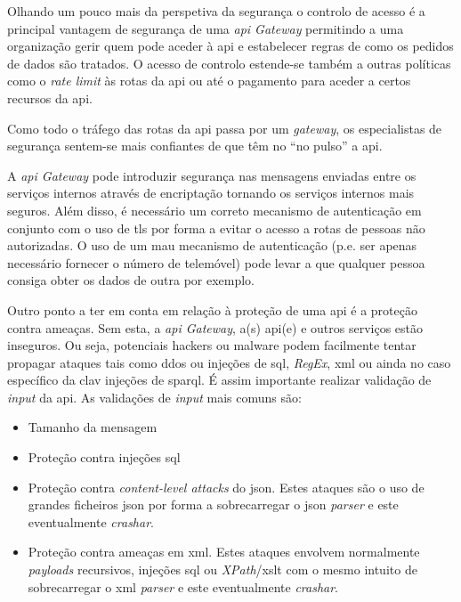 Olhando um pouco mais da perspetiva da segurança o controlo de acesso é a principal vantagem de segurança de uma \textit{\acrshort{api} Gateway} permitindo a uma organização gerir quem pode aceder à \acrshort{api} e estabelecer regras de como os pedidos de dados são tratados. O acesso de controlo estende-se também a outras políticas como o \textit{rate limit} às rotas da \acrshort{api} ou até o pagamento para aceder a certos recursos da \acrshort{api}.

Como todo o tráfego das rotas da \acrshort{api} passa por um \textit{gateway}, os especialistas de segurança sentem-se mais confiantes de que têm no ``no pulso'' a \acrshort{api}.~\cite{apiGatInfo}

A \textit{\acrshort{api} Gateway} pode introduzir segurança nas mensagens enviadas entre os serviços internos através de encriptação tornando os serviços internos mais seguros. Além disso, é necessário um correto mecanismo de autenticação em conjunto com o uso de \acrshort{tls} por forma a evitar o acesso a rotas de pessoas não autorizadas. O uso de um mau mecanismo de autenticação (p.e. ser apenas necessário fornecer o número de telemóvel) pode levar a que qualquer pessoa consiga obter os dados de outra por exemplo.

Outro ponto a ter em conta em relação à proteção de uma \acrshort{api} é a proteção contra ameaças. Sem esta, a \textit{\acrshort{api} Gateway}, a(s) \acrshort{api}(e) e outros serviços estão inseguros. Ou seja, potenciais hackers ou malware podem facilmente tentar propagar ataques tais como \acrshort{ddos} ou injeções de \acrshort{sql}, \textit{RegEx}, \acrshort{xml} ou ainda no caso específico da \acrshort{clav} injeções de \acrshort{sparql}. É assim importante realizar validação de \textit{input} da \acrshort{api}. As validações de \textit{input} mais comuns são:
\begin{itemize}
    \item Tamanho da mensagem
    \item Proteção contra injeções \acrshort{sql}
    \item Proteção contra \textit{content-level attacks} do \acrshort{json}. Estes ataques são o uso de grandes ficheiros \acrshort{json} por forma a sobrecarregar o \acrshort{json} \textit{parser} e este eventualmente \textit{crashar}.
    \item Proteção contra ameaças em \acrshort{xml}. Estes ataques envolvem normalmente \textit{payloads} recursivos, injeções \acrshort{sql} ou \textit{XPath}/\acrshort{xslt} com o mesmo intuito de sobrecarregar o \acrshort{xml} \textit{parser} e este eventualmente \textit{crashar}.
\end{itemize}

